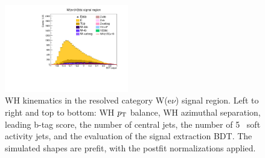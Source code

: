 \begin{figure}[tbp]
\begin{center}
    \includegraphics[width=0.48\textwidth]{figures/wlnhbb2016/resolved/WenWHSR_bdtValue.pdf}
    \caption{WH kinematics in the resolved category W(e$\nu$) signal region.
    Left to right and top to bottom: WH $p_{\mathrm{T}}$ balance, WH azimuthal separation, leading b-tag score, the number of central jets,
    the number of 5 \GeV\ soft activity jets, and the evaluation of the signal extraction BDT.
    The simulated shapes are prefit, with the postfit normalizations applied.}
    \label{fig:res_WenSR_WH}
  \end{center}
\end{figure}
\clearpage


